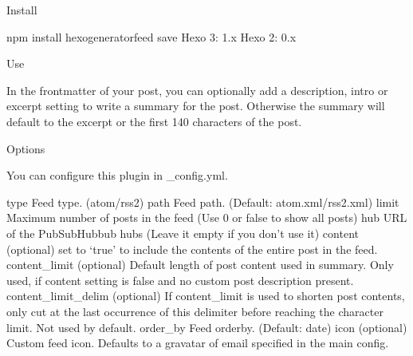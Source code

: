 \documentclass[letterpaper,12pt,english]{sphinxmanual}
\begin{document}
Install

\begin{sphinxVerbatim}[commandchars=\\\{\}]
\PYGZdl{} npm install hexo\PYGZhy{}generator\PYGZhy{}feed \PYGZhy{}\PYGZhy{}save
Hexo 3: 1.x
Hexo 2: 0.x
\end{sphinxVerbatim}

Use

In the front\sphinxhyphen{}matter of your post, you can optionally add a description, intro or excerpt setting to write a summary for the post. Otherwise the summary will default to the excerpt or the first 140 characters of the post.

Options

You can configure this plugin in \_config.yml.

\begin{sphinxVerbatim}[commandchars=\\\{\}]
   
   
   
   
   
   
   
\end{sphinxVerbatim}

type \sphinxhyphen{} Feed type. (atom/rss2)
path \sphinxhyphen{} Feed path. (Default: atom.xml/rss2.xml)
limit \sphinxhyphen{} Maximum number of posts in the feed (Use 0 or false to show all posts)
hub \sphinxhyphen{} URL of the PubSubHubbub hubs (Leave it empty if you don’t use it)
content \sphinxhyphen{} (optional) set to ‘true’ to include the contents of the entire post in the feed.
content\_limit \sphinxhyphen{} (optional) Default length of post content used in summary. Only used, if content setting is false and no custom post description present.
content\_limit\_delim \sphinxhyphen{} (optional) If content\_limit is used to shorten post contents, only cut at the last occurrence of this delimiter before reaching the character limit. Not used by default.
order\_by \sphinxhyphen{} Feed order\sphinxhyphen{}by. (Default: \sphinxhyphen{}date)
icon \sphinxhyphen{} (optional) Custom feed icon. Defaults to a gravatar of email specified in the main config.
\end{document}
